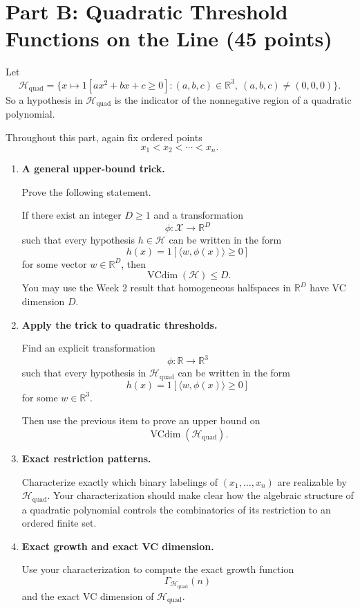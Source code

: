 \documentclass{article}
\begin{document}
\section{Part B: Quadratic Threshold Functions on the Line (45 points)}

Let
$$
\mathcal{H}_{\mathrm{quad}}
=
\{x \mapsto 1[ax^2 + bx + c \ge 0] : (a,b,c) \in \mathbb{R}^3,\ (a,b,c) \ne (0,0,0)\}.
$$
So a hypothesis in $\mathcal{H}_{\mathrm{quad}}$ is the indicator of the nonnegative region of a quadratic polynomial.

Throughout this part, again fix ordered points
$$
x_1 < x_2 < \cdots < x_n.
$$

\begin{enumerate}
\item \textbf{A general upper-bound trick.}

Prove the following statement.

If there exist an integer $D \ge 1$ and a transformation
$$
\phi : \mathcal{X} \to \mathbb{R}^D
$$
such that every hypothesis $h \in \mathcal{H}$ can be written in the form
$$
h(x) = 1[\langle w, \phi(x) \rangle \ge 0]
$$
for some vector $w \in \mathbb{R}^D$, then
$$
\operatorname{VCdim}(\mathcal{H}) \le D.
$$
You may use the Week 2 result that homogeneous halfspaces in $\mathbb{R}^D$ have VC dimension $D$.

\item \textbf{Apply the trick to quadratic thresholds.}

Find an explicit transformation
$$
\phi : \mathbb{R} \to \mathbb{R}^3
$$
such that every hypothesis in $\mathcal{H}_{\mathrm{quad}}$ can be written in the form
$$
h(x) = 1[\langle w, \phi(x) \rangle \ge 0]
$$
for some $w \in \mathbb{R}^3$.

Then use the previous item to prove an upper bound on
$$
\operatorname{VCdim}(\mathcal{H}_{\mathrm{quad}}).
$$

\item \textbf{Exact restriction patterns.}

Characterize exactly which binary labelings of $(x_1,\dots,x_n)$ are realizable by $\mathcal{H}_{\mathrm{quad}}$.
Your characterization should make clear how the algebraic structure of a quadratic polynomial controls the combinatorics of its restriction to an ordered finite set.

\item \textbf{Exact growth and exact VC dimension.}

Use your characterization to compute the exact growth function
$$
\Gamma_{\mathcal{H}_{\mathrm{quad}}}(n)
$$
and the exact VC dimension of $\mathcal{H}_{\mathrm{quad}}$.


\end{enumerate}
\end{document}
